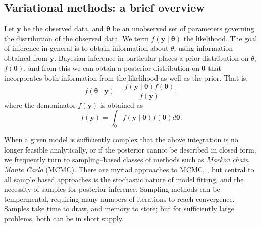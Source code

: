 
\subsection{Variational methods: a brief overview}
Let $\bm{y}$ be the observed data, and $\bm{\theta}$ be an unobserved set of 
    parameters governing the distribution of the observed data.  We term 
    $f(\bm{y}\mid\bm{\theta})$ the likelihood.  The goal of inference in 
    general is to obtain information about $\theta$, using information 
    obtained from $\bm{y}$. Bayesian inference in particular places a prior
    distribution on $\theta$, $f(\bm{\theta})$, and from this we can obtain a
    posterior distribution on $\bm{\theta}$ that incorporates both information
    from the likelihood as well as the prior.  That is,
    \[
        f(\bm{\theta}\mid\bm{y}) = 
            \frac{f(\bm{y}\mid\bm{\theta})f(\bm{\theta})}{f(\bm{y})},
    \]
    where the demoninator $f(\bm{y})$ is obtained as
    \[
    f(\bm{y}) = \int_{\bm{\theta}}f(\bm{y}\mid\bm{\theta})f(\bm{\theta})d\bm{\theta}.
    \]

When a given model is sufficiently complex that the above integration is no
    longer feasible analytically, or if the posterior cannot be described in
    closed form, we frequently 
    turn to sampling--based classes of methods such as 
    \emph{Markov chain Monte Carlo} (MCMC)\needcite. There are myriad approaches 
    to MCMC, , but central to all sample
    based approaches is the stochastic nature of model fitting, and the 
    necessity of samples for posterior inference.  Sampling methods can be 
    tempermental, requiring many numbers of iterations to reach convergence.
    Samples take time to draw, and memory to store; but for sufficiently large 
    problems, both can be in short supply.

